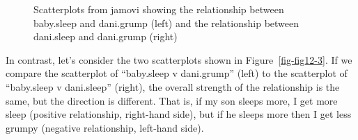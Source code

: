 \documentclass[
  a4paper,
]{book}
\begin{document}
\begin{figure}[H]
\begin{minipage}[b]{0.50\linewidth}
{}

\subcaption{\label{fig-fig12-2b}}
\end{minipage}%

\caption{\label{fig-fig12-2}Scatterplots from jamovi showing the
relationship between baby.sleep and dani.grump (left) and the
relationship between dani.sleep and dani.grump (right)}

\end{figure}

In contrast, let's consider the two scatterplots shown in
Figure~\ref{fig-fig12-3}. If we compare the scatterplot of ``baby.sleep
v dani.grump'' (left) to the scatterplot of ``baby.sleep v dani.sleep''
(right), the overall strength of the relationship is the same, but the
direction is different. That is, if my son sleeps more, I get more sleep
(positive relationship, right-hand side), but if he sleeps more then I
get less grumpy (negative relationship, left-hand side).
\end{document}
